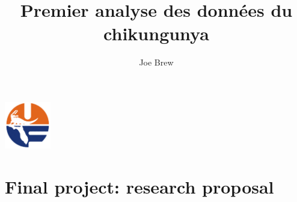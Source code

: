 \documentclass[11pt]{article}
\begin{document}


\title{\textbf{Premier analyse des données du chikungunya}}
\author{Joe Brew}


\maketitle

\emph{
\blindtext
}
\tableofcontents

\vspace{20mm}

\begin{center}
\includegraphics[width=2cm]{uf}
\end{center}



\section*{Final project: research proposal}
\hrulefill
\end{document}
